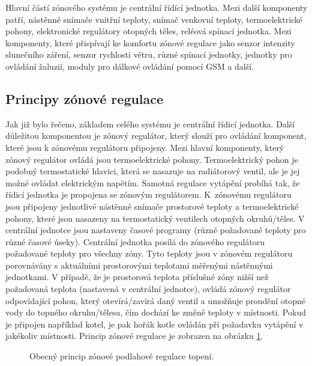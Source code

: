Hlavní částí zónového systému je centrální řídící jednotka. Mezi další komponenty patří, nástěnné snímače vnitřní teploty, snímač venkovní teploty, termoelektrické pohony, elektronické regulátory otopných těles, reléová spínací jednotka. Mezi komponenty, které přispívají ke komfortu zónové regulace jako senzor intenzity slunečního záření, senzor rychlosti větru, různé spínací jednotky, jednotky pro ovládání žaluzií, moduly pro dálkové ovládání pomocí GSM a další.

\subsection{Principy zónové regulace}

Jak již bylo řečeno, základem celého systému je centrální řídicí jednotka. Další důležitou komponentou je zónový regulátor, který slouží pro ovládání komponent, které jsou k zónovému regulátoru připojeny. Mezi hlavní komponenty, který zónový regulátor ovládá jsou termoelektrické pohony. Termoelektrický pohon je podobný termostatické hlavici, která se nasazuje na radiátorový ventil, ale je jej možné ovládat elektrickým napětím. Samotná regulace vytápění probíhá tak, že řídicí jednotka je propojena se zónovým regulátorem. K~zónovému regulátoru jsou připojeny jednotlivé nástěnné snímače  prostorové teploty a termoelektrické pohony, které jsou nasazeny na termostatický ventilech otopných okruhů/těles. V centrální jednotce jsou nastaveny časové programy (různé požadované teploty pro různé časové úseky). Centrální jednotka posílá do zónového regulátoru požadované teploty pro všechny zóny. Tyto  teploty jsou v zónovém regulátoru porovnávány s aktuálními prostorovými teplotami měřenými nástěnnými jednotkami. V případě, že je prostorová teplota příslušné zóny nižší než požadovaná teplota (nastavená v centrální jednotce), ovládá zónový regulátor odpovídající pohon, který otevírá/zavírá daný ventil a umožňuje proudění otopné vody do topného okruhu/tělesa, čím dochází ke změně teploty v místnosti. Pokud je připojen například kotel, je pak hořák kotle ovládán při požadavku vytápění v jakékoliv místnosti. Princip zónové regulace je zobrazen na obrázku \ref{fig:obecny-princip-zonove-regulace}.

\begin{figure}[H]
    \centering
    \def\svgwidth{\columnwidth}
    
    \caption{ Obecný princip zónové podlahové regulace topení.}
    \label{fig:obecny-princip-zonove-regulace}
\end{figure}

